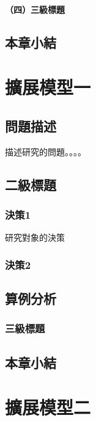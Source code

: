 \documentclass[14pt, a4paper,openany]{ctexbook} %
\renewcommand\thechapter{第\chinese{chapter}章}  %
\renewcommand{\chaptername}{{\thechapter}}
\numberwithin{figure}{chapter}
\numberwithin{table}{chapter}
\begin{document}
\subsubsection{（四）三級標題}



\section{本章小結}



\clearpage


\chapter{擴展模型一}
\renewcommand{\chaptername}{第\chinese{chapter}章~~擴展模型一}
\section{問題描述}

描述研究的問題。。。。

\section{二級標題}

\subsection{決策1}
  研究對象的決策
\subsection{決策2}

\section{算例分析}
\subsection{三級標題}



\section{本章小結}




\newpage
\chapter{擴展模型二}
\renewcommand{\chaptername}{第\chinese{chapter}章~~擴展模型二}
\end{document}
